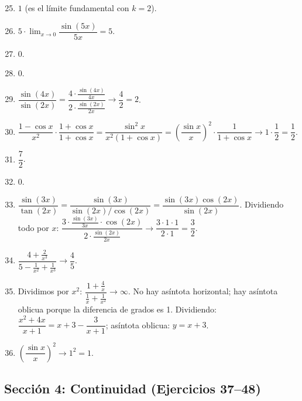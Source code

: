 \documentclass[12pt, a4paper]{article}
\begin{document}
\begin{enumerate}[leftmargin=*, label=\textbf{\arabic*.}]
  \setcounter{enumi}{24}
  \item $1$ (es el límite fundamental con $k = 2$).

  \item $5 \cdot \lim_{x \to 0} \dfrac{\sin(5x)}{5x} = 5$.

  \item $0$.

  \item $0$.

  \item $\dfrac{\sin(4x)}{\sin(2x)} = \dfrac{4 \cdot \frac{\sin(4x)}{4x}}{2 \cdot \frac{\sin(2x)}{2x}} \to \dfrac{4}{2} = 2$.

  \item $\dfrac{1 - \cos x}{x^2} \cdot \dfrac{1 + \cos x}{1 + \cos x} = \dfrac{\sin^2 x}{x^2(1 + \cos x)} = \left(\dfrac{\sin x}{x}\right)^2 \cdot \dfrac{1}{1 + \cos x} \to 1 \cdot \dfrac{1}{2} = \dfrac{1}{2}$.

  \item $\dfrac{7}{2}$.

  \item $0$.

  \item $\dfrac{\sin(3x)}{\tan(2x)} = \dfrac{\sin(3x)}{\sin(2x)/\cos(2x)} = \dfrac{\sin(3x) \cos(2x)}{\sin(2x)}$. Dividiendo todo por $x$: $\dfrac{3 \cdot \frac{\sin(3x)}{3x} \cdot \cos(2x)}{2 \cdot \frac{\sin(2x)}{2x}} \to \dfrac{3 \cdot 1 \cdot 1}{2 \cdot 1} = \dfrac{3}{2}$.

  \item $\dfrac{4 + \frac{2}{x^3}}{5 - \frac{1}{x^2} + \frac{1}{x^3}} \to \dfrac{4}{5}$.

  \item Dividimos por $x^2$: $\dfrac{1 + \frac{4}{x}}{\frac{1}{x} + \frac{1}{x^2}} \to \infty$. No hay asíntota horizontal; hay asíntota oblicua porque la diferencia de grados es 1. Dividiendo: $\dfrac{x^2 + 4x}{x + 1} = x + 3 - \dfrac{3}{x + 1}$; asíntota oblicua: $y = x + 3$.

  \item $\left(\dfrac{\sin x}{x}\right)^2 \to 1^2 = 1$.
\end{enumerate}

\subsection*{Sección 4: Continuidad (Ejercicios 37--48)}
\end{document}
